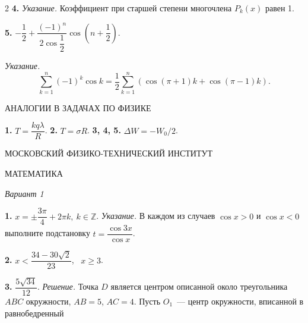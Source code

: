 \begin{multicols}{2}
\vspace{0.2cm}
\noindent
\textbf{4.} \textit{Указание.} Коэффициент при старшей степени многочлена $P_k(x)$ равен 1.

\vspace{0.2cm}
\noindent
\textbf{5.} $-\dfrac{1}{2} + \dfrac{(-1)^n}{2\cos\dfrac{1}{2}}\cos\left(n + \dfrac{1}{2}\right)$.

\vspace{0.2cm}
\noindent
\textit{Указание.}
\[
\sum_{k=1}^n (-1)^k \cos k = \dfrac{1}{2}\sum_{k=1}^n \left(\cos(\pi+1)k + \cos(\pi-1)k\right).
\]

\vspace{0.2cm}

\noindent
\large
АНАЛОГИИ В ЗАДАЧАХ ПО ФИЗИКЕ
\vspace{0.2cm}

\small
\noindent
\textbf{1.} $T = \dfrac{kq\lambda}{R}$. \quad
\textbf{2.} $T = \sigma R$. \quad
\textbf{3, 4, 5.} $\Delta W = -W_0/2$.

\vspace{0.2cm}
\noindent
\large
МОСКОВСКИЙ ФИЗИКО-ТЕХНИЧЕСКИЙ ИНСТИТУТ
\vspace{0.2cm}

\small
\noindent
МАТЕМАТИКА

\vspace{0.2cm}
\noindent
\textit{Вариант 1}

\noindent
\textbf{1.} $x = \pm \dfrac{3\pi}{4} + 2\pi k, \ k \in \mathbb{Z}$. \textit{Указание.} В каждом из случаев $\cos x > 0$ и $\cos x < 0$ выполните подстановку $t = \dfrac{\cos 3x}{\cos x}$.

\vspace{0.2cm}
\noindent
\textbf{2.} $x < \dfrac{34 - 30\sqrt{2}}{23}$, \ $x \geq 3$.

\vspace{0.2cm}
\noindent
\textbf{3.} $\dfrac{5\sqrt{34}}{12}$. \textit{Решение.} Точка $D$ является центром описанной около треугольника $ABC$ окружности, $AB = 5$, $AC = 4$. Пусть $O_1$~--- центр окружности, вписанной в равнобедренный

\end{multicols}

